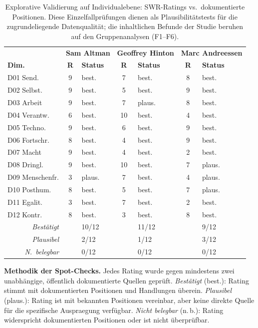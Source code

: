 \documentclass[12pt,a4paper]{article}
\begin{document}
\begin{table}[htbp]
  \centering
  \caption{Explorative Validierung auf Individualebene: SWR-Ratings vs.\ dokumentierte Positionen. Diese Einzelfallpr\"ufungen dienen als Plausibilit\"atstests f\"ur die zugrundeliegende Datenqualit\"at; die inhaltlichen Befunde der Studie beruhen auf den Gruppenanalysen (F1--F6).}
  \label{tab:spotchecks}
  \footnotesize
  \begin{tabularx}{\textwidth}{l c l c l c l}
    \toprule
    & \multicolumn{2}{c}{\textbf{Sam Altman}} & \multicolumn{2}{c}{\textbf{Geoffrey Hinton}} & \multicolumn{2}{c}{\textbf{Marc Andreessen}} \\
    \textbf{Dim.} & \textbf{R} & \textbf{Status} & \textbf{R} & \textbf{Status} & \textbf{R} & \textbf{Status} \\
    \midrule
    D01 Send. & 9 & best. & 7 & best. & 8 & best. \\
    D02 Selbst. & 9 & best. & 5 & best. & 9 & best. \\
    D03 Arbeit & 9 & best. & 7 & plaus. & 8 & best. \\
    D04 Verantw. & 6 & best. & 10 & best. & 4 & best. \\
    D05 Techno. & 9 & best. & 6 & best. & 9 & best. \\
    D06 Fortschr. & 8 & best. & 4 & best. & 9 & best. \\
    D07 Macht & 9 & best. & 4 & best. & 2 & best. \\
    D08 Dringl. & 9 & best. & 10 & best. & 7 & plaus. \\
    D09 Menschenfr. & 3 & plaus. & 7 & best. & 4 & plaus. \\
    D10 Posthum. & 8 & best. & 5 & best. & 7 & plaus. \\
    D11 Egalit. & 3 & best. & 7 & best. & 2 & best. \\
    D12 Kontr. & 8 & best. & 3 & best. & 8 & best. \\
    \midrule
    \multicolumn{1}{r}{\textit{Best\"atigt}} & & 10/12 & & 11/12 & & 9/12 \\
    \multicolumn{1}{r}{\textit{Plausibel}} & & 2/12 & & 1/12 & & 3/12 \\
    \multicolumn{1}{r}{\textit{N.\ belegbar}} & & 0/12 & & 0/12 & & 0/12 \\
    \bottomrule
  \end{tabularx}
\end{table}

\noindent\textbf{Methodik der Spot-Checks.} Jedes Rating wurde gegen mindestens zwei unabh\"angige, \"offentlich dokumentierte Quellen gepr\"uft. \emph{Best\"atigt} (best.): Rating stimmt mit dokumentierten Positionen und Handlungen \"uberein. \emph{Plausibel} (plaus.): Rating ist mit bekannten Positionen vereinbar, aber keine direkte Quelle f\"ur die spezifische Ausprae\-gung verf\"ugbar. \emph{Nicht belegbar} (n.\,b.): Rating widerspricht dokumentierten Positionen oder ist nicht \"uberpr\"ufbar.
\end{document}
